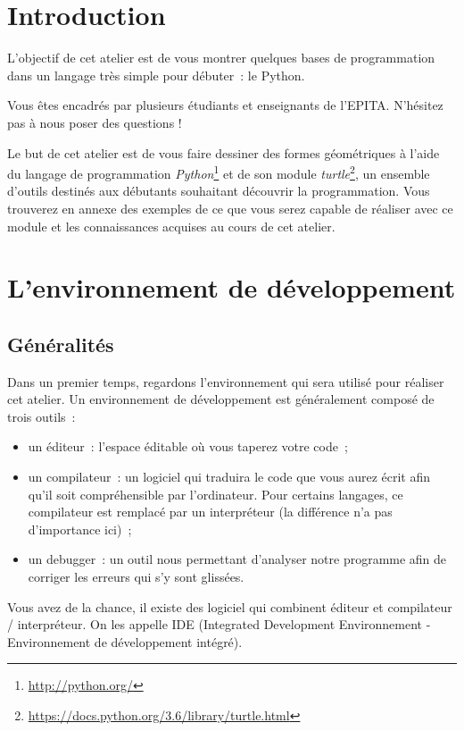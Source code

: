 \documentclass[11pt,a4paper]{article}
\begin{document}

\section{Introduction}
L'objectif de cet atelier est de vous montrer quelques bases de
programmation dans un langage très simple pour débuter~: le Python.

Vous êtes encadrés par plusieurs étudiants et enseignants de l'EPITA. N'hésitez
pas à nous poser des questions !

Le but de cet atelier est de vous faire dessiner des formes géométriques
à l'aide du langage de programmation
\emph{Python}\footnote{\url{http://python.org/}} et de son module
\emph{turtle}\footnote{\url{https://docs.python.org/3.6/library/turtle.html}},
un ensemble d'outils destinés aux débutants souhaitant découvrir la
programmation.  Vous trouverez en annexe des exemples de ce que vous serez
capable de réaliser avec ce module et les connaissances acquises au cours de cet
atelier.

\section{L'environnement de développement}
\subsection{Généralités}

Dans un premier temps, regardons l'environnement qui sera utilisé pour réaliser
cet atelier. Un environnement de développement est généralement composé de trois
outils~:

\begin{itemize}
    \item un éditeur~: l'espace éditable où vous taperez votre code~;
    \item un compilateur~: un logiciel qui traduira le code que vous aurez
        écrit afin qu'il soit compréhensible par l'ordinateur. Pour certains
        langages, ce compilateur est remplacé par un interpréteur (la différence
        n'a pas d'importance ici)~;
    \item un debugger~: un outil nous permettant d'analyser notre programme afin
        de corriger les erreurs qui s'y sont glissées.
\end{itemize}

Vous avez de la chance, il existe des logiciel qui combinent éditeur et
compilateur / interpréteur. On les appelle IDE (Integrated Development
Environnement - Environnement de développement intégré).
\end{document}

